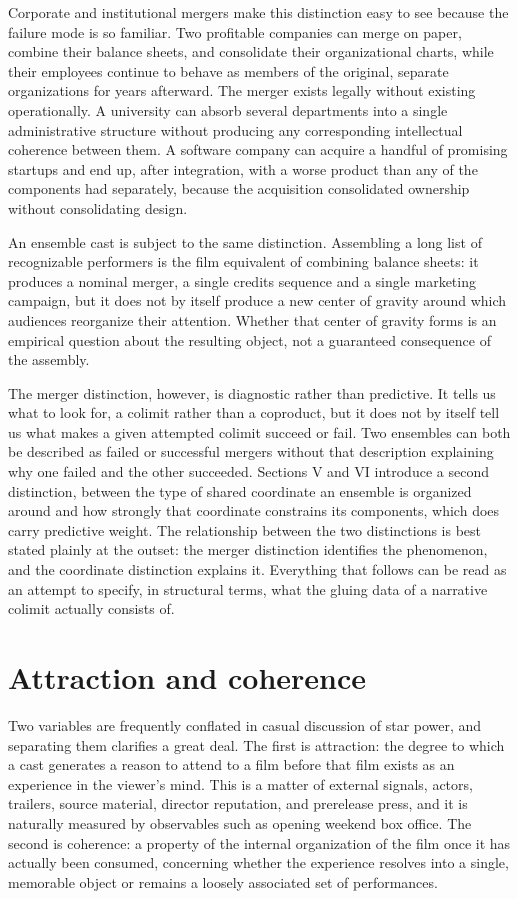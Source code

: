 \documentclass[11pt]{article}
\begin{document}
Corporate and institutional mergers make this distinction easy to see because the failure mode is so familiar. Two profitable companies can merge on paper, combine their balance sheets, and consolidate their organizational charts, while their employees continue to behave as members of the original, separate organizations for years afterward. The merger exists legally without existing operationally. A university can absorb several departments into a single administrative structure without producing any corresponding intellectual coherence between them. A software company can acquire a handful of promising startups and end up, after integration, with a worse product than any of the components had separately, because the acquisition consolidated ownership without consolidating design.

An ensemble cast is subject to the same distinction. Assembling a long list of recognizable performers is the film equivalent of combining balance sheets: it produces a nominal merger, a single credits sequence and a single marketing campaign, but it does not by itself produce a new center of gravity around which audiences reorganize their attention. Whether that center of gravity forms is an empirical question about the resulting object, not a guaranteed consequence of the assembly.

The merger distinction, however, is diagnostic rather than predictive. It tells us what to look for, a colimit rather than a coproduct, but it does not by itself tell us what makes a given attempted colimit succeed or fail. Two ensembles can both be described as failed or successful mergers without that description explaining why one failed and the other succeeded. Sections V and VI introduce a second distinction, between the type of shared coordinate an ensemble is organized around and how strongly that coordinate constrains its components, which does carry predictive weight. The relationship between the two distinctions is best stated plainly at the outset: the merger distinction identifies the phenomenon, and the coordinate distinction explains it. Everything that follows can be read as an attempt to specify, in structural terms, what the gluing data of a narrative colimit actually consists of.

\section{Attraction and coherence}

Two variables are frequently conflated in casual discussion of star power, and separating them clarifies a great deal. The first is attraction: the degree to which a cast generates a reason to attend to a film before that film exists as an experience in the viewer's mind. This is a matter of external signals, actors, trailers, source material, director reputation, and prerelease press, and it is naturally measured by observables such as opening weekend box office. The second is coherence: a property of the internal organization of the film once it has actually been consumed, concerning whether the experience resolves into a single, memorable object or remains a loosely associated set of performances.
\end{document}
